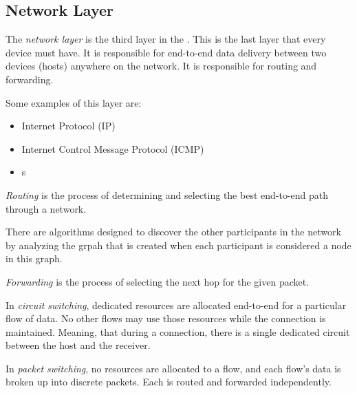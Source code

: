 \subsection{Network Layer}\label{subsec:Network_Layer}
\begin{definition}\label{def:Network_Layer}
  The \emph{network layer} is the third layer in the .
  This is the last layer that every device must have.
  It is responsible for end-to-end data delivery between two devices (hosts) anywhere on the network.
  It is responsible for routing and forwarding.

  Some examples of this layer are:
  \begin{itemize}[noitemsep]
  \item Internet Protocol (IP)
  \item Internet Control Message Protocol (ICMP)
  \item {}s
  \end{itemize}
\end{definition}

\begin{definition}[Routing]\label{def:Routing}
  \emph{Routing} is the process of determining and selecting the best end-to-end path through a network.

  There are algorithms designed to discover the other participants in the network by analyzing the grpah that is created when each participant is considered a node in this graph.
\end{definition}

\begin{definition}[Forwarding]\label{def:Forwarding}
  \emph{Forwarding} is the process of selecting the next hop for the given packet.
\end{definition}

\begin{definition}\label{def:Circuit_Switching}
  In \emph{circuit switching}, dedicated resources are allocated end-to-end for a particular flow of data.
  No other flows may use those resources while the connection is maintained.
  Meaning, that during a connection, there is a single dedicated circuit between the host and the receiver.
\end{definition}

\begin{definition}\label{def:Packet_Switching}
  In \emph{packet switching}, no resources are allocated to a flow, and each flow’s data is broken up into discrete packets.
  Each  is routed and forwarded independently.
\end{definition}


